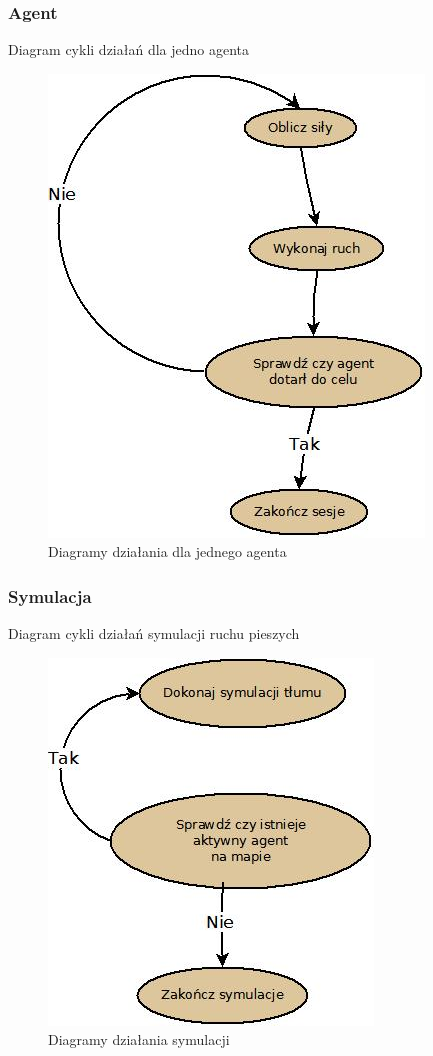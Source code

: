 \subsubsection{Agent}
Diagram cykli działań dla jedno agenta
\begin{figure}[ht]
\centering
\includegraphics[scale=0.5]{DiagramAgent}
\caption{Diagramy działania dla jednego agenta}
\end{figure}

\subsubsection{Symulacja}
Diagram cykli działań symulacji ruchu pieszych
\begin{figure}[ht]
\centering
\includegraphics[scale=0.5]{DiagramAgenty}
\caption{Diagramy działania symulacji}
\end{figure}

